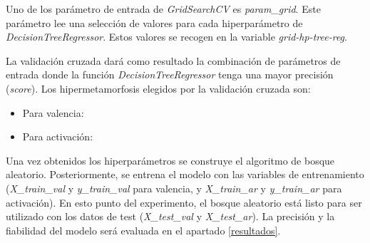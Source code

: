 \documentclass[12pt,a4paper,Spanish]{article}
\begin{document}
Uno de los parámetro de entrada de \textit{GridSearchCV} es \textit{param\_grid}. Este parámetro lee una selección de valores para cada hiperparámetro de \textit{DecisionTreeRegressor}. Estos valores se recogen en la variable \textit{grid-hp-tree-reg}.

La validación cruzada dará como resultado la combinación de parámetros de entrada donde la función \textit{DecisionTreeRegressor} tenga una mayor precisión (\textit{score}). Los hipermetamorfosis elegidos por la validación cruzada son:
\begin{itemize}
	\item Para valencia:
	\item Para activación:
\end{itemize}
Una vez obtenidos los hiperparámetros se construye el algoritmo de bosque aleatorio. Posteriormente, se entrena el modelo con las variables de entrenamiento (\textit{X\_train\_val} y \textit{y\_train\_val} para valencia, y \textit{X\_train\_ar} y \textit{y\_train\_ar} para activación).
\newline
En esto punto del experimento, el bosque aleatorio está listo para ser utilizado con los datos de test (\textit{X\_test\_val} y \textit{X\_test\_ar}). La precisión y la fiabilidad del modelo será evaluada en el apartado \ref{resultados}.
\end{document}

